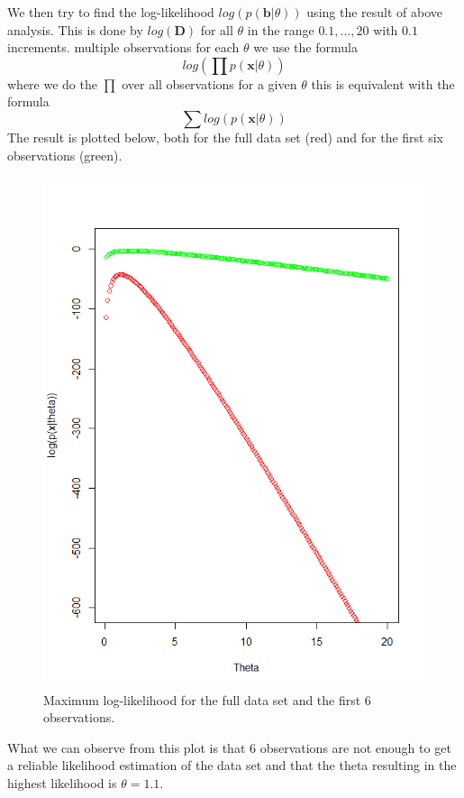 \documentclass[a4paper,12pt]{article}
\begin{document}
We then try to find the log-likelihood \(log(p(\textbf{b} | \theta))\) using the result of above analysis. This is done by \( log( \mathbf{D} )\) for all \(\theta\) in the range \(0.1,...,20\) with \(0.1\) increments. multiple observations for each \( \theta \) we use the formula 
\begin{equation}
  log( \prod p(\mathbf{x} |\theta))
\end{equation}
where we do the \( \prod \) over all observations for a given \(\theta\) this is equivalent with the formula
\begin{equation}
  \sum{log(p(\mathbf{x} |\theta))}
\end{equation}
The result is plotted below, both for the full data set (red) and for the first six observations (green).
\begin{figure}[H]
\centering
\begin{minipage}[]{0.5\textwidth}
  \includegraphics[width=\textwidth]{figures/Lab1_A2_ll_and_ll6.png}  
  \caption{Maximum log-likelihood for the full data set and the first 6 observations.\label{fig:Maximum log-likelihood for the full data set and the first 6 observations} }
 \end{minipage}
\end{figure}
What we can observe from this plot is that 6 observations are not enough to get a reliable likelihood estimation of the data set and that the theta resulting in the highest likelihood is \(\theta = 1.1\).
\end{document}
